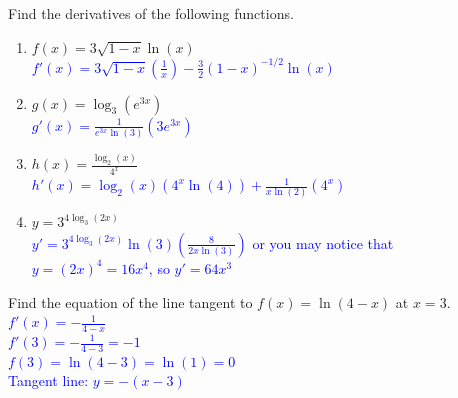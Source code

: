 \documentclass{ximera}
\begin{document}


\begin{exercise}
    Find the derivatives of the following functions.
    \begin{enumerate}
        \item $f(x)=3\sqrt{1-x}\ln(x)$\\
        \textcolor{blue}{$f'(x)=3\sqrt{1-x}\left(\frac{1}{x}\right)-\frac32(1-x)^{-1/2}\ln(x)$}
        \item $g(x)=\log_3(e^{3x})$\\
        \textcolor{blue}{$g'(x)=\frac{1}{e^{3x}\ln(3)}(3e^{3x})$}
        \item $h(x)=\frac{\log_2(x)}{4^x}$\\
        \textcolor{blue}{$h'(x)=\log_2(x)(4^x\ln(4))+\frac{1}{x\ln(2)}(4^x)$}
        \item $y=3^{4\log_3(2x)}$\\
        \textcolor{blue}{$y'=3^{4\log_3(2x)}\ln(3)\left(\frac{8}{2x\ln(3)}\right)$ or you may notice that $y=(2x)^4=16x^4$, so $y'=64x^3$}
    \end{enumerate}
\end{exercise}

\begin{exercise}
    Find the equation of the line tangent to $f(x)=\ln(4-x)$ at $x=3$.\\
    \textcolor{blue}{$f'(x)=-\frac{1}{4-x}$\\
    $f'(3)=-\frac{1}{4-3}=-1$\\
    $f(3)=\ln(4-3)=\ln(1)=0$\\
    Tangent line: $y=-(x-3)$}
\end{exercise}
\end{document}
